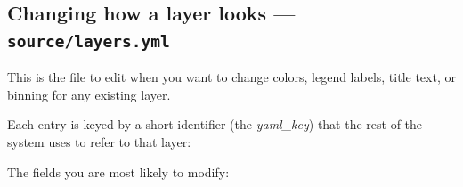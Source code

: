 \documentclass[
  letterpaper,
  DIV=11,
  numbers=noendperiod]{scrreprt}
\newenvironment{Shaded}{\begin{snugshade}}{\end{snugshade}}
\newcommand{\AttributeTok}[1]{\textcolor[rgb]{0.40,0.45,0.13}{#1}}
\newcommand{\DecValTok}[1]{\textcolor[rgb]{0.68,0.00,0.00}{#1}}
\newcommand{\FunctionTok}[1]{\textcolor[rgb]{0.28,0.35,0.67}{#1}}
\newcommand{\KeywordTok}[1]{\textcolor[rgb]{0.00,0.23,0.31}{\textbf{#1}}}
\newcommand{\StringTok}[1]{\textcolor[rgb]{0.13,0.47,0.30}{#1}}
\begin{document}
\subsection{\texorpdfstring{Changing how a layer looks ---
\texttt{source/layers.yml}}{Changing how a layer looks --- source/layers.yml}}\label{changing-how-a-layer-looks-sourcelayers.yml}

This is the file to edit when you want to change colors, legend labels,
title text, or binning for any existing layer.

Each entry is keyed by a short identifier (the \emph{yaml\_key}) that
the rest of the system uses to refer to that layer:

\begin{Shaded}
\end{Shaded}

The fields you are most likely to modify:
\end{document}
